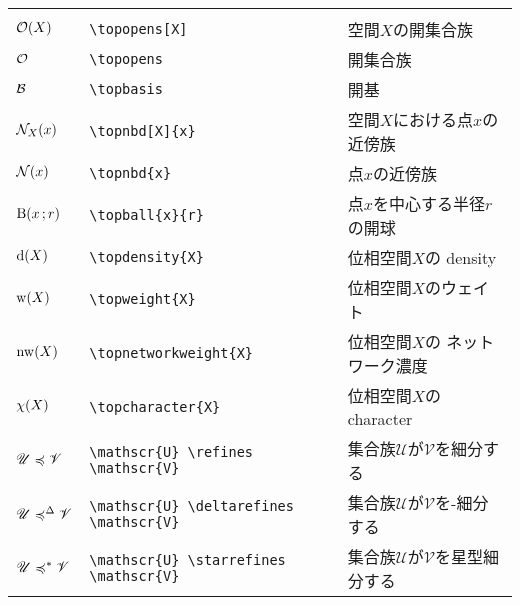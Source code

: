 \documentclass[uplatex, dvipdfmx, 12pt, crop=false]{standalone}
\begin{document}
\begin{table}[htb]
\begin{tabular}{ll@{\qquad}l}
		\tablesubtitle{位相空間に関する数式記号} \\
		$\topopens[X]$                          & \verb|\topopens[X]|                          & 空間$X$の開集合族                                       \\
		$\topopens$                             & \verb|\topopens|                             & 開集合族                                                \\
		$\mathcal{B}$                             & \verb|\topbasis|                             & 開基                                                    \\
		$\topnbd[X]{x}$                         & \verb|\topnbd[X]{x}|                         & 空間$X$における点$x$の近傍族                            \\
		$\topnbd{x}$                            & \verb|\topnbd{x}|                            & 点$x$の近傍族                                           \\
		$\topball{x}{r}$                        & \verb|\topball{x}{r}|                        & 点$x$を中心する半径$r$の開球                            \\
		$\topdensity{X}$                        & \verb|\topdensity{X}|                        & 位相空間$X$の density                                   \\
		$\topweight{X}$                         & \verb|\topweight{X}|                         & 位相空間$X$のウェイト                                   \\
		$\topnetworkweight{X}$                  & \verb|\topnetworkweight{X}|                  & 位相空間$X$の ネットワーク濃度                          \\
		$\topcharacter{X}$                      & \verb|\topcharacter{X}|                      & 位相空間$X$の character                                 \\
		$\mathscr{U} \preccurlyeq \mathscr{V}$      & \verb|\mathscr{U} \refines \mathscr{V}|      & 集合族$\mathscr{U}$が$\mathscr{V}$を細分する            \\
		$\mathscr{U} \preccurlyeq^{\Delta} \mathscr{V}$ & \verb|\mathscr{U} \deltarefines \mathscr{V}| & 集合族$\mathscr{U}$が$\mathscr{V}$を\textDelta-細分する \\
		$\mathscr{U} \preccurlyeq^{\ast} \mathscr{V}$  & \verb|\mathscr{U} \starrefines \mathscr{V}|  & 集合族$\mathscr{U}$が$\mathscr{V}$を星型細分する        \\
		\hline


\end{tabular}
\end{table}
\end{document}
